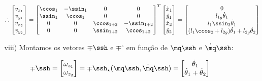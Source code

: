 \begin{itemize}
\begin{itemize}
	
	\begin{equation}
	\therefore
	\begin{bmatrix}
	v_{x_1} \\
	v_{y_1} \\
	v_{x_2} \\
	v_{y_2} \\
	\end{bmatrix}
	=
	\begin{bmatrix}
	\ccos_1 & -\ssin_1 & 0 & 0 \\
	\ssin_1 & \ccos_1 & 0 & 0 \\
	0 & 0 & \ccos_{1+2} & -\ssin_{1+2} \\
	0 & 0 & \ssin_{1+2} & \ccos_{1+2} \\
	\end{bmatrix}^T
	\begin{bmatrix}
	\dot{x}_1 \\
	\dot{y}_1 \\	
	\dot{x}_2 \\
	\dot{y}_2 \\	
	\end{bmatrix}
	=
	\begin{bmatrix}
	0 \\
	l_{1g} \dot{\theta}_1 \\
	l_1 \ssin_2 \dot{\theta}_1\\
	(l_1 \ccos_2 + l_{2g} )\dot{\theta}_1 + l_{2g} \dot{\theta}_2 \\
	\end{bmatrix}
	\end{equation}
	
	\item[viii)] Montamos os vetores $\mp\ssh$ e $\mp^\circ$ em fun\c{c}\~ao de $\mq\ssh$ e $\dot{\mq}\ssh$:

	\begin{equation}
	\mp\ssh = 
	\begin{bmatrix}
	\omega_{z_1} \\
	\omega_{z_2} \\
	\end{bmatrix}
	= \mp\ssh_\star (\mq\ssh, \dot{\mq}\ssh ) =
	\begin{bmatrix}
	\dot{\theta}_1 \\
	\dot{\theta}_1 +\dot{\theta}_2 \\
	\end{bmatrix}
	\end{equation}
	

\end{itemize}
\end{itemize}
